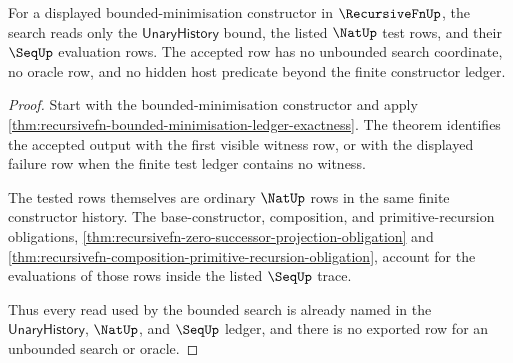 \begin{theorem}
\label{thm:recursivefn-bounded-search-scope-obligation}
For a displayed bounded-minimisation constructor in $\RecursiveFnUp$, the
search reads only the $\mathsf{UnaryHistory}$ bound, the listed $\NatUp$ test
rows, and their $\SeqUp$ evaluation rows. The accepted row has no unbounded
search coordinate, no oracle row, and no hidden host predicate beyond the
finite constructor ledger.
\end{theorem}
\begin{proof}
Start with the bounded-minimisation constructor and apply
\autoref{thm:recursivefn-bounded-minimisation-ledger-exactness}. The theorem
identifies the accepted output with the first visible witness row, or with the
displayed failure row when the finite test ledger contains no witness.

The tested rows themselves are ordinary $\NatUp$ rows in the same finite
constructor history. The base-constructor, composition, and
primitive-recursion obligations,
\autoref{thm:recursivefn-zero-successor-projection-obligation} and
\autoref{thm:recursivefn-composition-primitive-recursion-obligation}, account
for the evaluations of those rows inside the listed $\SeqUp$ trace.

Thus every read used by the bounded search is already named in the
$\mathsf{UnaryHistory}$, $\NatUp$, and $\SeqUp$ ledger, and there is no
exported row for an unbounded search or oracle.
\end{proof}


